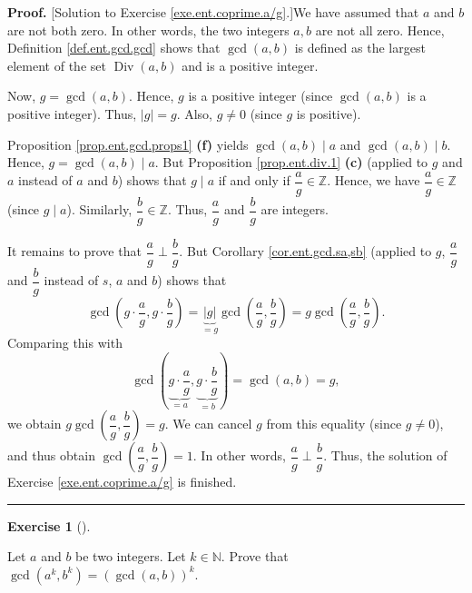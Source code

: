 \documentclass[numbers=enddot,12pt,final,onecolumn,notitlepage]{scrartcl}%
\newcounter{exer}
\numberwithin{exer}{subsection}
\theoremstyle{definition}
\newtheorem{exmp}[exer]{Exercise}
\newenvironment{exercise}[1][]
{\begin{exmp}[#1]\begin{leftbar}}
{\end{leftbar}\end{exmp}}
\newenvironment{fineprint}{\begin{small}}{\end{small}}
\newenvironment{proof}[1][Proof]{\noindent\textbf{#1.} }{\ \rule{0.5em}{0.5em}}
\begin{document}
\begin{fineprint}
\begin{proof}
[Solution to Exercise \ref{exe.ent.coprime.a/g}.]We have assumed that $a$ and
$b$ are not both zero. In other words, the two integers $a,b$ are not all
zero. Hence, Definition \ref{def.ent.gcd.gcd} shows that $\gcd\left(
a,b\right)  $ is defined as the largest element of the set
$\operatorname*{Div}\left(  a,b\right)  $ and is a positive integer.

Now, $g=\gcd\left(  a,b\right)  $. Hence, $g$ is a positive integer (since
$\gcd\left(  a,b\right)  $ is a positive integer). Thus, $\left\vert
g\right\vert =g$. Also, $g\neq0$ (since $g$ is positive).

Proposition \ref{prop.ent.gcd.props1} \textbf{(f)} yields $\gcd\left(
a,b\right)  \mid a$ and $\gcd\left(  a,b\right)  \mid b$. Hence,
$g=\gcd\left(  a,b\right)  \mid a$. But Proposition \ref{prop.ent.div.1}
\textbf{(c)} (applied to $g$ and $a$ instead of $a$ and $b$) shows that $g\mid
a$ if and only if $\dfrac{a}{g}\in\mathbb{Z}$. Hence, we have $\dfrac{a}{g}%
\in\mathbb{Z}$ (since $g\mid a$). Similarly, $\dfrac{b}{g}\in\mathbb{Z}$.
Thus, $\dfrac{a}{g}$ and $\dfrac{b}{g}$ are integers.

It remains to prove that $\dfrac{a}{g}\perp\dfrac{b}{g}$. But Corollary
\ref{cor.ent.gcd.sa,sb} (applied to $g$, $\dfrac{a}{g}$ and $\dfrac{b}{g}$
instead of $s$, $a$ and $b$) shows that%
\[
\gcd\left(  g\cdot\dfrac{a}{g},g\cdot\dfrac{b}{g}\right)
=\underbrace{\left\vert g\right\vert }_{=g}\gcd\left(  \dfrac{a}{g},\dfrac
{b}{g}\right)  =g\gcd\left(  \dfrac{a}{g},\dfrac{b}{g}\right)  .
\]
Comparing this with%
\[
\gcd\left(  \underbrace{g\cdot\dfrac{a}{g}}_{=a},\underbrace{g\cdot\dfrac
{b}{g}}_{=b}\right)  =\gcd\left(  a,b\right)  =g,
\]
we obtain $g\gcd\left(  \dfrac{a}{g},\dfrac{b}{g}\right)  =g$. We can cancel
$g$ from this equality (since $g\neq0$), and thus obtain $\gcd\left(
\dfrac{a}{g},\dfrac{b}{g}\right)  =1$. In other words, $\dfrac{a}{g}%
\perp\dfrac{b}{g}$. Thus, the solution of Exercise \ref{exe.ent.coprime.a/g}
is finished.
\end{proof}
\end{fineprint}

\begin{exercise}
\label{exe.ent.gcd.akbk}Let $a$ and $b$ be two integers. Let $k\in\mathbb{N}$.
Prove that $\gcd\left(  a^{k},b^{k}\right)  =\left(  \gcd\left(  a,b\right)
\right)  ^{k}$.
\end{exercise}
\end{document}
